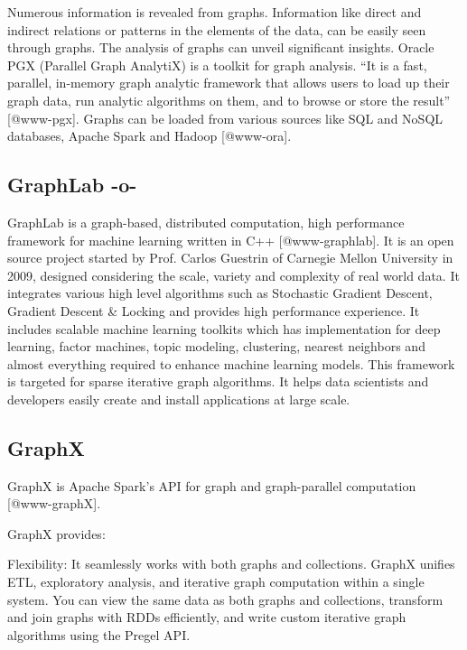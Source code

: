 Numerous information is revealed from graphs. Information like direct
and indirect relations or patterns in the elements of the data, can be
easily seen through graphs. The analysis of graphs can unveil
significant insights. Oracle PGX (Parallel Graph AnalytiX) is a
toolkit for graph analysis.  ``It is a fast, parallel, in-memory graph
analytic framework that allows users to load up their graph data, run
analytic algorithms on them, and to browse or store the
result'' [@www-pgx]. Graphs can be loaded from various sources
like SQL and NoSQL databases, Apache Spark and Hadoop [@www-ora].
    
\subsection{GraphLab -o-}

GraphLab is a graph-based, distributed computation, high performance
framework for machine learning written in C++ [@www-graphlab]. It
is an open source project started by Prof. Carlos Guestrin of Carnegie
Mellon University in 2009, designed considering the scale, variety and
complexity of real world data. It integrates various high level
algorithms such as Stochastic Gradient Descent, Gradient Descent \&
Locking and provides high performance experience. It includes scalable
machine learning toolkits which has implementation for deep learning,
factor machines, topic modeling, clustering, nearest neighbors and
almost everything required to enhance machine learning models. This
framework is targeted for sparse iterative graph algorithms. It helps
data scientists and developers easily create and install applications
at large scale.


    
\subsection{GraphX}

GraphX is Apache Spark's API for graph and graph-parallel
computation [@www-graphX].
    
GraphX provides:
    
    Flexibility: It seamlessly works with both graphs and
    collections. GraphX unifies ETL, exploratory analysis, and
    iterative graph computation within a single system. You can view
    the same data as both graphs and collections, transform and join
    graphs with RDDs efficiently, and write custom iterative graph
    algorithms using the Pregel API.
    

